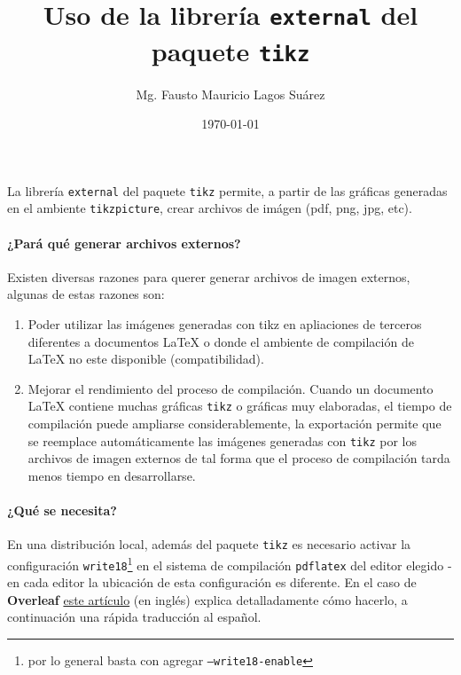 \documentclass{article}
\title{Uso de la librería \texttt{external} del paquete \texttt{tikz}}
\author{Mg. Fausto Mauricio Lagos Suárez}
\date{\today}
\begin{document}
\maketitle

La librería \texttt{external} del paquete \texttt{tikz} permite, a partir de las gráficas generadas en el ambiente \texttt{tikzpicture}, crear archivos de imágen (pdf, png, jpg, etc).

\paragraph{¿Pará qué generar archivos externos?} Existen diversas razones para querer generar archivos de imagen externos, algunas de estas razones son:
\begin{enumerate}
	\item Poder utilizar las imágenes generadas con tikz en apliaciones de terceros diferentes a documentos \LaTeX{} o donde el ambiente de compilación de \LaTeX{} no este disponible (compatibilidad).
    \item Mejorar el rendimiento del proceso de compilación. Cuando un documento \LaTeX{} contiene muchas gráficas \texttt{tikz} o gráficas muy elaboradas, el tiempo de compilación puede ampliarse considerablemente, la exportación permite que se reemplace automáticamente las imágenes generadas con \texttt{tikz} por los archivos de imagen externos de tal forma que el proceso de compilación tarda menos tiempo en desarrollarse.
\end{enumerate}

\paragraph{¿Qué se necesita?} En una distribución local, además del paquete \texttt{tikz} es necesario activar la configuración \texttt{write18}\footnote{por lo general basta con agregar \texttt{--write18-enable}} en el sistema de compilación \texttt{pdflatex} del editor elegido - en cada editor la ubicación de esta configuración es diferente. En el caso de \textbf{Overleaf} \href{https://www.overleaf.com/help/205-i-have-a-lot-of-tikz-matlab2tikz-or-pgfplots-figures-so-im-getting-a-compilation-timeout-can-i-externalise-my-figures#.WZ5KK3UjFQI}{este artículo} (en inglés) explica detalladamente cómo hacerlo, a continuación una rápida traducción al español.
\end{document}
